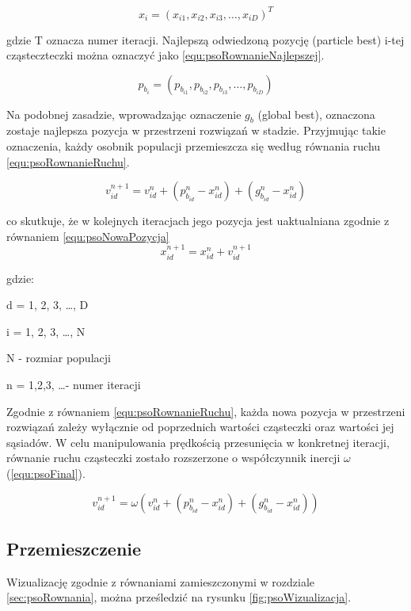 \begin{equation}
\label{equ:psoRownanieCzasteczki}
x_i = (x_{i1}, x_{i2}, x_{i3}, \dots, x_{iD})^T
\end{equation}

gdzie T oznacza numer iteracji. Najlepszą odwiedzoną pozycję (particle best) i-tej cząsteczteczki można oznaczyć jako \ref{equ:psoRownanieNajlepszej}.

\begin{equation}
\label{equ:psoRownanieNajlepszej}
p_{b_i} = (p_{b_{i1}}, p_{b_{i2}}, p_{b_{i3}}, \dots, p_{b_{iD}})
\end{equation}

Na podobnej zasadzie, wprowadzając oznaczenie $g_b$ (global best), oznaczona zostaje najlepsza pozycja w przestrzeni rozwiązań w stadzie. Przyjmując takie oznaczenia, każdy osobnik populacji przemieszcza się według równania ruchu \ref{equ:psoRownanieRuchu}.

\begin{equation}
\label{equ:psoRownanieRuchu}
v_{id}^{n+1} = v_{id}^{n} + (p_{b_{id}}^n - x_{id}^n) + (g_{b_{id}}^n - x_{id}^n)
\end{equation}

co skutkuje, że w kolejnych iteracjach jego pozycja jest uaktualniana zgodnie z równaniem \ref{equ:psoNowaPozycja}
\begin{equation}
\label{equ:psoNowaPozycja}
x_{id}^{n+1} = x_{id}^n + v_{id}^{n+1}
\end{equation}

gdzie:

d = 1, 2, 3, \dots, D

i = 1, 2, 3, \dots, N

N - rozmiar populacji

n = 1,2,3, \dots - numer iteracji

Zgodnie z równaniem \ref{equ:psoRownanieRuchu}, każda nowa pozycja w przestrzeni rozwiązań zależy wyłącznie od poprzednich wartości cząsteczki oraz wartości jej sąsiadów. W celu manipulowania prędkością przesunięcia w konkretnej iteracji, równanie ruchu cząsteczki zostało rozszerzone o współczynnik inercji $\omega$ (\ref{equ:psoFinal}).

\begin{equation}
\label{equ:psoFinal}
v_{id}^{n+1} = \omega(v_{id}^{n} + (p_{b_{id}}^n - x_{id}^n) + (g_{b_{id}}^n - x_{id}^n))
\end{equation}


\subsection*{Przemieszczenie}
\label{sec:psoPrzemieszczenie}
Wizualizację zgodnie z równaniami zamieszczonymi w rozdziale \ref{sec:psoRownania}, można prześledzić na rysunku \ref{fig:psoWizualizacja}.

